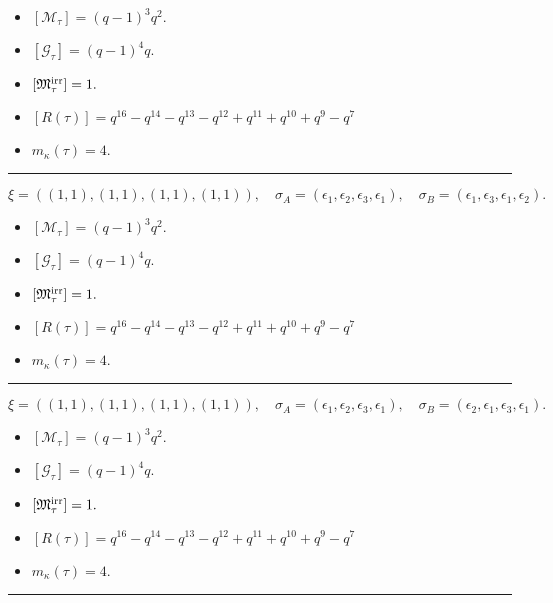 \documentclass[10pt,a4paper]{amsart}
\begin{document}
\begin{itemize}
 \item $[\mathcal{M}_{\tau}] = {\left(q - 1\right)}^{3} q^{2} .$

 \item $[\mathcal{G}_{\tau}] = {\left(q - 1\right)}^{4} q .$

 \item $[{\frak M}_{\tau}^{\textrm{irr}}] = 1 .$

 \item $[R(\tau)] = q^{16} - q^{14} - q^{13} - q^{12} + q^{11} + q^{10} + q^{9} - q^{7} $

 \item $m_{\kappa}(\tau) = 4 .$

 \end{itemize}
\noindent\rule{8cm}{0.4pt}

$$\xi = ({(1, 1)}, {(1, 1)}, {(1, 1)}, {(1, 1)}),\quad \sigma_A = ({{\epsilon_1}}, {{\epsilon_2}}, {{\epsilon_3}}, {{\epsilon_1}}),\quad \sigma_B = ({{\epsilon_1}}, {{\epsilon_3}}, {{\epsilon_1}}, {{\epsilon_2}}).$$

\begin{itemize}
 \item $[\mathcal{M}_{\tau}] = {\left(q - 1\right)}^{3} q^{2} .$

 \item $[\mathcal{G}_{\tau}] = {\left(q - 1\right)}^{4} q .$

 \item $[{\frak M}_{\tau}^{\textrm{irr}}] = 1 .$

 \item $[R(\tau)] = q^{16} - q^{14} - q^{13} - q^{12} + q^{11} + q^{10} + q^{9} - q^{7} $

 \item $m_{\kappa}(\tau) = 4 .$

 \end{itemize}
\noindent\rule{8cm}{0.4pt}

$$\xi = ({(1, 1)}, {(1, 1)}, {(1, 1)}, {(1, 1)}),\quad \sigma_A = ({{\epsilon_1}}, {{\epsilon_2}}, {{\epsilon_3}}, {{\epsilon_1}}),\quad \sigma_B = ({{\epsilon_2}}, {{\epsilon_1}}, {{\epsilon_3}}, {{\epsilon_1}}).$$

\begin{itemize}
 \item $[\mathcal{M}_{\tau}] = {\left(q - 1\right)}^{3} q^{2} .$

 \item $[\mathcal{G}_{\tau}] = {\left(q - 1\right)}^{4} q .$

 \item $[{\frak M}_{\tau}^{\textrm{irr}}] = 1 .$

 \item $[R(\tau)] = q^{16} - q^{14} - q^{13} - q^{12} + q^{11} + q^{10} + q^{9} - q^{7} $

 \item $m_{\kappa}(\tau) = 4 .$

 \end{itemize}
\noindent\rule{8cm}{0.4pt}
\end{document}

